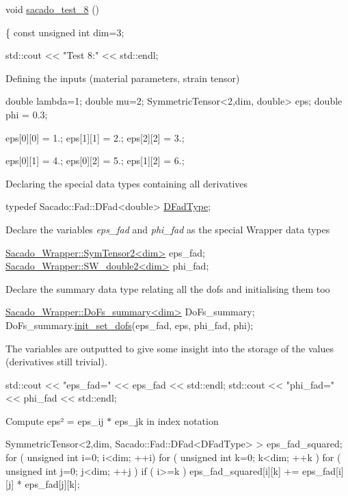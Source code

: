 \begin{DoxyCode}
\textcolor{keywordtype}{void} \hyperlink{Sacado__example_8cc_aa7108ff8393b98d66dfef50899d048d9}{sacado\_test\_8} ()
 
\{
    \textcolor{keyword}{const} \textcolor{keywordtype}{unsigned} \textcolor{keywordtype}{int} dim=3;
 
    std::cout << \textcolor{stringliteral}{"Test 8:"} << std::endl;
\end{DoxyCode}
 Defining the inputs (material parameters, strain tensor) 
\begin{DoxyCode}
\textcolor{keywordtype}{double} lambda=1;
\textcolor{keywordtype}{double} mu=2;
SymmetricTensor<2,dim, double> eps;
\textcolor{keywordtype}{double} phi = 0.3;

eps[0][0] = 1.;
eps[1][1] = 2.;
eps[2][2] = 3.;

eps[0][1] = 4.;
eps[0][2] = 5.;
eps[1][2] = 6.;
\end{DoxyCode}
 Declaring the special data types containing all derivatives 
\begin{DoxyCode}
\textcolor{keyword}{typedef} Sacado::Fad::DFad<double> \hyperlink{Sacado__Wrapper_8h_a7e0893207b87dad05c66a34baac8ed2e}{DFadType};
\end{DoxyCode}
 Declare the variables {\itshape eps\+\_\+fad} and {\itshape phi\+\_\+fad} as the special Wrapper data types 
\begin{DoxyCode}
\hyperlink{classSacado__Wrapper_1_1SymTensor2}{Sacado\_Wrapper::SymTensor2<dim>} eps\_fad;
\hyperlink{classSacado__Wrapper_1_1SW__double2}{Sacado\_Wrapper::SW\_double2<dim>} phi\_fad;
\end{DoxyCode}
 Declare the summary data type relating all the dofs and initialising them too 
\begin{DoxyCode}
\hyperlink{classSacado__Wrapper_1_1DoFs__summary}{Sacado\_Wrapper::DoFs\_summary<dim>} DoFs\_summary;
DoFs\_summary.\hyperlink{classSacado__Wrapper_1_1DoFs__summary_ae273d0fa3197118a11d7005523e27d8a}{init\_set\_dofs}(eps\_fad, eps, phi\_fad, phi);
\end{DoxyCode}
 The variables are outputted to give some insight into the storage of the values (derivatives still trivial). 
\begin{DoxyCode}
std::cout << \textcolor{stringliteral}{"eps\_fad="} << eps\_fad << std::endl;
std::cout << \textcolor{stringliteral}{"phi\_fad="} << phi\_fad << std::endl;
\end{DoxyCode}
 Compute eps² = eps\+\_\+ij $\ast$ eps\+\_\+jk in index notation 
\begin{DoxyCode}
SymmetricTensor<2,dim, Sacado::Fad::DFad<DFadType> > eps\_fad\_squared;
\textcolor{keywordflow}{for} ( \textcolor{keywordtype}{unsigned} \textcolor{keywordtype}{int} i=0; i<dim; ++i)
   \textcolor{keywordflow}{for} ( \textcolor{keywordtype}{unsigned} \textcolor{keywordtype}{int} k=0; k<dim; ++k )
       \textcolor{keywordflow}{for} ( \textcolor{keywordtype}{unsigned} \textcolor{keywordtype}{int} j=0; j<dim; ++j )
           \textcolor{keywordflow}{if} ( i>=k )
               eps\_fad\_squared[i][k] += eps\_fad[i][j] * eps\_fad[j][k];
\end{DoxyCode}
